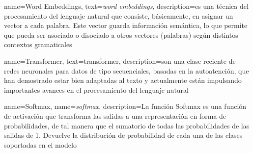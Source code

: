 


{
        name=Word Embeddings,
        text=\textit{word embeddings},
        description={es una técnica del procesamiento del lenguaje natural que consiste, básicamente, en asignar un vector a cada palabra. Este vector guarda información semántica, lo que permite que pueda ser asociado o disociado a otros vectores (palabras) según distintos contextos gramaticales}
}

{
        name=Transformer,
        text=transformer,
        description={son una clase reciente de redes neuronales para datos de tipo secuenciales, basadas en la autoatención, que han demostrado estar bien adaptadas al texto y actualmente están impulsando importantes avances en el procesamiento del lenguaje natural}
}

{
        name=Softmax,
        name=\textit{softmax},
        description={La función Softmax es una función de activación que transforma las salidas a una representación en forma de probabilidades, de tal manera que el sumatorio de todas las probabilidades de las salidas de 1. Devuelve la distribución de probabilidad de cada una de las clases soportadas en el modelo}
}

